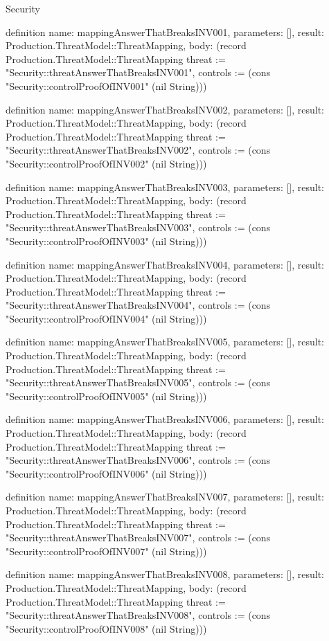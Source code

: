 \begin{lexlean}{Security}
\begin{semanticmodule}
definition{
  name: mappingAnswerThatBreaksINV001,
  parameters: [],
  result: Production.ThreatModel::ThreatMapping,
  body: (record Production.ThreatModel::ThreatMapping {threat := "Security::threatAnswerThatBreaksINV001", controls := (cons "Security::controlProofOfINV001" (nil String))})
}

definition{
  name: mappingAnswerThatBreaksINV002,
  parameters: [],
  result: Production.ThreatModel::ThreatMapping,
  body: (record Production.ThreatModel::ThreatMapping {threat := "Security::threatAnswerThatBreaksINV002", controls := (cons "Security::controlProofOfINV002" (nil String))})
}

definition{
  name: mappingAnswerThatBreaksINV003,
  parameters: [],
  result: Production.ThreatModel::ThreatMapping,
  body: (record Production.ThreatModel::ThreatMapping {threat := "Security::threatAnswerThatBreaksINV003", controls := (cons "Security::controlProofOfINV003" (nil String))})
}

definition{
  name: mappingAnswerThatBreaksINV004,
  parameters: [],
  result: Production.ThreatModel::ThreatMapping,
  body: (record Production.ThreatModel::ThreatMapping {threat := "Security::threatAnswerThatBreaksINV004", controls := (cons "Security::controlProofOfINV004" (nil String))})
}

definition{
  name: mappingAnswerThatBreaksINV005,
  parameters: [],
  result: Production.ThreatModel::ThreatMapping,
  body: (record Production.ThreatModel::ThreatMapping {threat := "Security::threatAnswerThatBreaksINV005", controls := (cons "Security::controlProofOfINV005" (nil String))})
}

definition{
  name: mappingAnswerThatBreaksINV006,
  parameters: [],
  result: Production.ThreatModel::ThreatMapping,
  body: (record Production.ThreatModel::ThreatMapping {threat := "Security::threatAnswerThatBreaksINV006", controls := (cons "Security::controlProofOfINV006" (nil String))})
}

definition{
  name: mappingAnswerThatBreaksINV007,
  parameters: [],
  result: Production.ThreatModel::ThreatMapping,
  body: (record Production.ThreatModel::ThreatMapping {threat := "Security::threatAnswerThatBreaksINV007", controls := (cons "Security::controlProofOfINV007" (nil String))})
}

definition{
  name: mappingAnswerThatBreaksINV008,
  parameters: [],
  result: Production.ThreatModel::ThreatMapping,
  body: (record Production.ThreatModel::ThreatMapping {threat := "Security::threatAnswerThatBreaksINV008", controls := (cons "Security::controlProofOfINV008" (nil String))})
}


\end{semanticmodule}
\end{lexlean}
